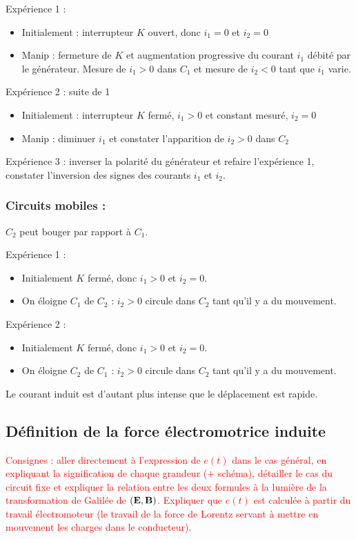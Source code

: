 \documentclass[11pt,a4paper]{report}
\begin{document}
Expérience 1 :
\begin{itemize}
	\item Initialement : interrupteur $K$ ouvert, donc $i_1 = 0$ et $i_2 = 0$
	\item Manip : fermeture de $K$ et augmentation progressive du courant $i_1$ débité par le générateur. Mesure de $i_1 > 0$ dans $C_1$ et mesure de $i_2 < 0$ tant que $i_1$ varie.
\end{itemize}

Expérience 2 : suite de 1
\begin{itemize}
	\item Initialement : interrupteur $K$ fermé, $i_1 > 0$ et constant mesuré, $i_2 = 0$
	\item Manip : diminuer $i_1$ et constater l'apparition de $i_2 > 0$ dans $C_2$
\end{itemize}
	
Expérience 3 : inverser la polarité du générateur et refaire l'expérience 1, constater l'inversion des signes des courants $i_1$ et $i_2$.

\subsubsection{Circuits mobiles :}

$C_2$ peut bouger par rapport à $C_1$.

Expérience 1 :
\begin{itemize}
	\item Initialement $K$ fermé, donc $i_1 > 0$ et $i_2 = 0$.
	\item On éloigne $C_1$ de $C_2$ : $i_2 > 0$ circule dans $C_2$ tant qu'il y a du mouvement. 
\end{itemize}

Expérience 2 :
\begin{itemize}
	\item Initialement $K$ fermé, donc $i_1 > 0$ et $i_2 = 0$.
	\item On éloigne $C_2$ de $C_1$ : $i_2 > 0$ circule dans $C_2$ tant qu'il y a du mouvement.
\end{itemize}
Le courant induit est d'autant plus intense que le déplacement est rapide.

\subsection{Définition de la force électromotrice induite}

\textcolor{red}{Consignes : aller directement à l'expression de $e(t)$ dans le cas général, en expliquant la signification de chaque grandeur ($+$ schéma), détailler le cas du circuit fixe et expliquer la relation entre les deux formules à la lumière de la transformation de Galilée de $(\bold{E},\bold{B})$. Expliquer que $e(t)$ est calculée à partir du travail électromoteur (le travail de la force de Lorentz servant à mettre en mouvement les charges dans le conducteur).}
\end{document}

